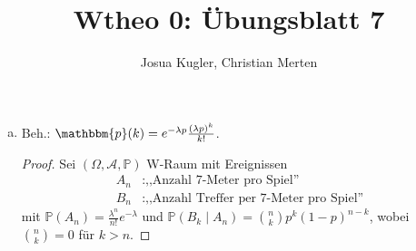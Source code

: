\documentclass[uebung]{lecture}
\title{Wtheo 0: Übungsblatt 7}
\author{Josua Kugler, Christian Merten}
\begin{document}
\newcommand{\indep}{\perp \!\!\! \perp}

\punkte[25]

\begin{aufgabe}[]
    \begin{enumerate}[(a)]
        \item Beh.: $\mathbbm{p}(k) = e^{-\lambda p } \frac{(\lambda p)^{k}}{k!}$.
            \begin{proof}
                Sei $(\Omega, \mathscr{A}, \mathbb{P})$ W-Raum mit Ereignissen
                \begin{align*}
                    A_n &\colon \text{,,Anzahl 7-Meter pro Spiel''} \\
                    B_n &\colon \text{,,Anzahl Treffer per 7-Meter pro Spiel''}
                \end{align*}
                mit $\mathbb{P}(A_n) = \frac{\lambda ^{n}}{n!} e^{-\lambda}$ und
                $\mathbb{P}(B_k  \mid A_n) = \binom{n}{k} p^{k} (1-p)^{n-k}$, wobei
                $\binom{n}{k} = 0$ für $k > n$.


\end{proof}
\end{enumerate}
\end{aufgabe}
\end{document}
